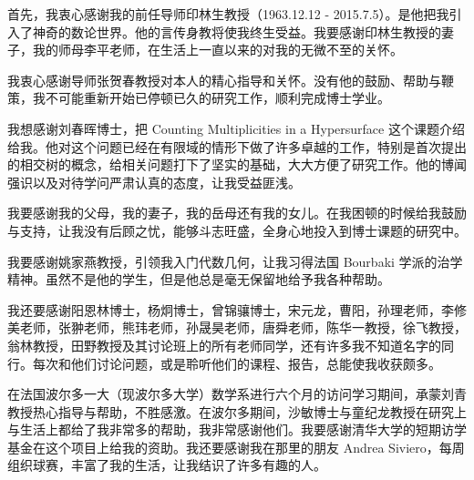 \begin{acknowledgement}
  首先，我衷心感谢我的前任导师印林生教授（1963.12.12 - 2015.7.5）。是他把我引入了神奇的数论世界。他的言传身教将使我终生受益。我要感谢印林生教授的妻子，我的师母李平老师，在生活上一直以来的对我的无微不至的关怀。
  
  我衷心感谢导师张贺春教授对本人的精心指导和关怀。没有他的鼓励、帮助与鞭策，我不可能重新开始已停顿已久的研究工作，顺利完成博士学业。
  
  我想感谢刘春晖博士，把 Counting Multiplicities in a Hypersurface 这个课题介绍给我。他对这个问题已经在有限域的情形下做了许多卓越的工作，特别是首次提出的相交树的概念，给相关问题打下了坚实的基础，大大方便了研究工作。他的博闻强识以及对待学问严肃认真的态度，让我受益匪浅。
  
  我要感谢我的父母，我的妻子，我的岳母还有我的女儿。在我困顿的时候给我鼓励与支持，让我没有后顾之忧，能够斗志旺盛，全身心地投入到博士课题的研究中。

  我要感谢姚家燕教授，引领我入门代数几何，让我习得法国 Bourbaki 学派的治学精神。虽然不是他的学生，但是他总是毫无保留地给予我各种帮助。
  
  我还要感谢阳恩林博士，杨炯博士，曾锦骧博士，宋元龙，曹阳，孙理老师，李修美老师，张翀老师，熊玮老师，孙晟昊老师，唐舜老师，陈华一教授，徐飞教授，翁林教授，田野教授及其讨论班上的所有老师同学，还有许多我不知道名字的同行。每次和他们讨论问题，或是聆听他们的课程、报告，总能使我收获颇多。
  
  在法国波尔多一大（现波尔多大学）数学系进行六个月的访问学习期间，承蒙刘青教授热心指导与帮助，不胜感激。在波尔多期间，沙敏博士与童纪龙教授在研究上与生活上都给了我非常多的帮助，我非常感谢他们。我要感谢清华大学的短期访学基金在这个项目上给我的资助。我还要感谢我在那里的朋友 Andrea Siviero，每周组织球赛，丰富了我的生活，让我结识了许多有趣的人。

\end{acknowledgement}
